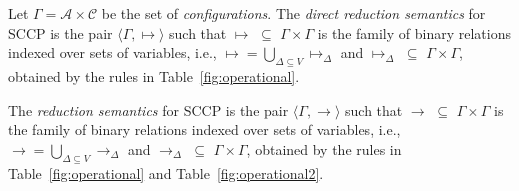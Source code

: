 \documentclass{llncs}
\def\C{{\mathcal C}}
\newcommand{\rarrow}{\rightarrow}
\def\C{{\mathcal C}}
\def\odiv{\, {\ominus\hspace{-7.7pt} \div} \,}
\begin{document}
\begin{definition}[Reductions]\label{def:reductions}
Let $\Gamma = {\mathcal A} \times \C$ be the set of \emph{configurations}.
The \emph{direct reduction semantics} for SCCP is the pair 
$\langle \Gamma,  \mapsto \rangle$
such that $\mapsto \, \, \subseteq \, \,\Gamma \times   \Gamma$ is the family 
 of binary relations indexed over sets of variables,
i.e., $\mapsto = \bigcup_{\Delta \subseteq V} \mapsto_\Delta$ and 
$\mapsto_\Delta \, \, \subseteq \, \,\Gamma \times \Gamma$, obtained by the rules in 
Table~\ref{fig:operational}.

The \emph{reduction semantics} for SCCP is the pair 
$\langle \Gamma,  \rightarrow \rangle$
such that $\rightarrow \, \, \subseteq \, \,\Gamma \times   \Gamma$ is the family 
 of binary relations indexed over sets of variables,
i.e., $\rightarrow = \bigcup_{\Delta \subseteq V} \rarrow_\Delta$ and 
$\rarrow_\Delta \, \, \subseteq \, \,\Gamma \times \Gamma$, obtained by the rules in 
Table~\ref{fig:operational} and Table~\ref{fig:operational2}.
\end{definition}

\def\odiv{\; {\ominus\hspace{-6pt} \div} \;}
\def\odivvv{\; {\ominus\hspace{-6pt} \div} \;}
\end{document}

